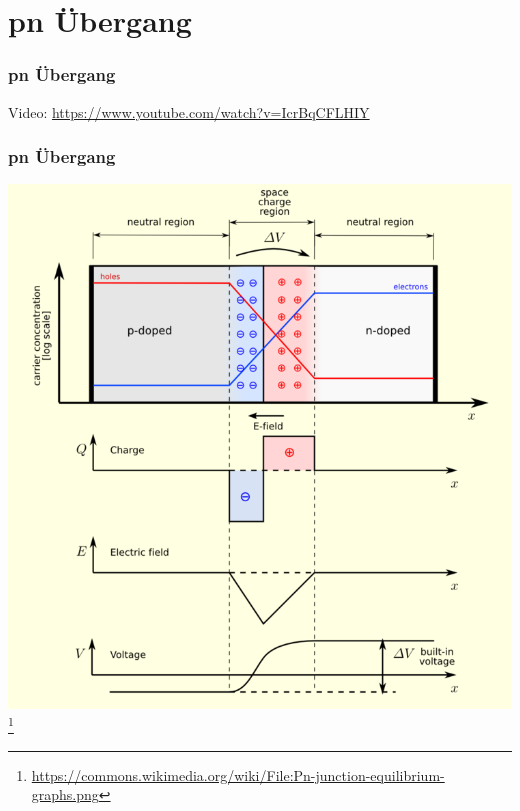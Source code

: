 

\section*{pn Übergang}

\begin{frame}
    \frametitle{pn Übergang}
    \begin{center}
Video: \url{https://www.youtube.com/watch?v=IcrBqCFLHIY}
	\end{center}
\end{frame}

\begin{frame}
    \frametitle{pn Übergang}
    \begin{center}
        \includegraphics[width=.7\textwidth]{e12/pn-Diagram.png}
        \footnote{\tiny \url{https://commons.wikimedia.org/wiki/File:Pn-junction-equilibrium-graphs.png}}
	\end{center}
\end{frame}

